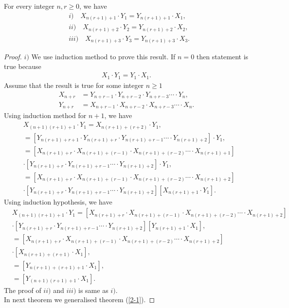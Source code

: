 \begin{theorem} For every integer $n,r\geq0$, we have\label{2-1}
\begin{align*}
&i) \quad X_{n(r+1)+1}\cdot Y_{1}=Y_{n(r+1)+1}\cdot X_{1},\\
&ii) \quad X_{n(r+1)+2}\cdot Y_{2}=Y_{n(r+1)+2}\cdot X_{2},\\
&iii) \quad X_{n(r+1)+3}\cdot Y_{3}=Y_{n(r+1)+3}\cdot X_{3}.
\end{align*}
\end{theorem}
\begin{proof} $i)$ We use induction method to prove this result. If $n=0$ then statement is true because
\begin{align*}
X_{1}\cdot Y_{1}=Y_{1}\cdot X_{1}.
\end{align*}
Assume that the result is true for some integer $n\geq1$
	\begin{align*}
	X_{n+r}&=Y_{n+r-1}\cdot Y_{n+r-2}\cdot Y_{n+r-3}\cdots\cdot Y_{n}, \\
	Y_{n+r}&=X_{n+r-1}\cdot X_{n+r-2}\cdot X_{n+r-3}\cdots\cdot X_{n}.
	\end{align*}
Using induction method for $n+1$, we have
\begin{align*}
&X_{(n+1)(r+1)+1}\cdot Y_{1}=X_{n(r+1)+(r+2)}\cdot Y_{1},\\
&=\left[Y_{n(r+1)+r+1}\cdot Y_{n(r+1)+r}\cdot Y_{n(r+1)+r-1}\cdots\cdot Y_{n(r+1)+2}\right]\cdot Y_{1},\\
&=\left[X_{n(r+1)+r}\cdot X_{n(r+1)+(r-1)}\cdot X_{n(r+1)+(r-2)}\cdots\cdot X_{n(r+1)+1}\right]\\
&\cdot\left[Y_{n(r+1)+r}\cdot Y_{n(r+1)+r-1}\cdots\cdot Y_{n(r+1)+2}\right]\cdot Y_{1},\\
&=\left[X_{n(r+1)+r}\cdot X_{n(r+1)+(r-1)}\cdot X_{n(r+1)+(r-2)}\cdots\cdot X_{n(r+1)+2}\right]\\
&\cdot\left[Y_{n(r+1)+r}\cdot Y_{n(r+1)+r-1}\cdots\cdot Y_{n(r+1)+2}\right]\left[X_{n(r+1)+1}\cdot Y_{1}\right].
\end{align*}
Using induction hypothesis, we have
\begin{align*}
&X_{(n+1)(r+1)+1}\cdot Y_{1}=\left[X_{n(r+1)+r}\cdot X_{n(r+1)+(r-1)}\cdot X_{n(r+1)+(r-2)}\cdots\cdot X_{n(r+1)+2}\right]\\
&\cdot\left[Y_{n(r+1)+r}\cdot Y_{n(r+1)+r-1}\cdots\cdot Y_{n(r+1)+2}\right]\left[Y_{n(r+1)+1}\cdot X_{1}\right],\\
&=\left[X_{n(r+1)+r}\cdot X_{n(r+1)+(r-1)}\cdot X_{n(r+1)+(r-2)}\cdots\cdot X_{n(r+1)+2}\right]\\
&\cdot\left[X_{n(r+1)+(r+1)}\cdot X_{1}\right],\\
&=\left[Y_{n(r+1)+(r+1)+1}\cdot X_{1}\right],\\
&=\left[Y_{(n+1)(r+1)+1}\cdot X_{1}\right].
\end{align*}
\noindent The proof of $ii)$ and $iii)$ is same as $i)$.\\ In next theorem we generalised theorem (\ref{2-1}).
\end{proof}
